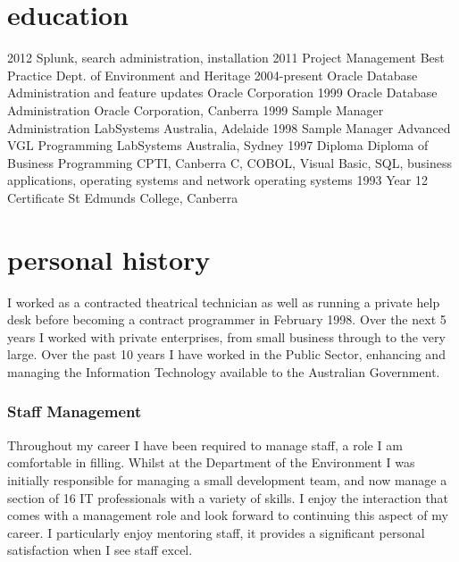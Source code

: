 \documentclass{resume} %
\begin{document}
\section{education}
\begin{entrylist}
\entry
{2012}
{Splunk, search administration, installation}
{ }
{ }
\entry
{2011}
{Project Management Best Practice}
{Dept. of Environment and Heritage}
{ }
\entry
{2004-present}
{Oracle {\normalfont Database Administration and feature updates}}
{Oracle Corporation}
{ }
\entry
{1999}
{Oracle {\normalfont Database Administration}}
{Oracle Corporation, Canberra}
{ }
\entry
{1999}
{Sample Manager {\normalfont Administration}}
{LabSystems Australia, Adelaide}
{ }
\entry
{1998}
{Sample Manager {\normalfont Advanced VGL Programming}}
{LabSystems Australia, Sydney}
{ }
\entry
{1997}
{Diploma {\normalfont Diploma of Business Programming}}
{CPTI, Canberra}
{C, COBOL, Visual Basic, SQL, business applications, operating systems and network operating systems}
\entry
{1993}
{Year 12 Certificate}
{St Edmunds College, Canberra}
{ }
\end{entrylist}

\section{personal history}
I worked as a contracted theatrical technician as well as running a private help desk before becoming a contract programmer in February 1998. Over the next 5 years I worked with private enterprises, from small business through to the very large. Over the past 10 years I have worked in the Public Sector, enhancing and managing the Information Technology available to the Australian Government.

\subsubsection*{Staff Management}
Throughout my career I have been required to manage staff, a role I am comfortable in filling. Whilst at the Department of the Environment I was initially responsible for managing a small development team, and now manage a section of 16 IT professionals with a variety of skills.  I enjoy the interaction that comes with a management role and look forward to continuing this aspect of my career.  I particularly enjoy mentoring staff, it provides a significant personal satisfaction when I see staff excel.
\end{document}
